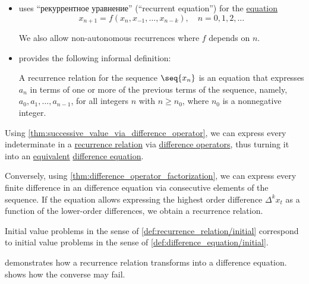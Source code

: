 \begin{remark}
\begin{itemize}
    We base our exposition of recurrences in finite fields in  on their book, but also consider more general recurrent sequences, and emphasize the difference between recurrence relations and sequences satisfying them.

    \item \Textcite[21]{Юмагулов2015ДинамическиеСистемы} uses \enquote{рекуррентное уравнение} (\enquote{recurrent equation}) for the \hyperref[def:equation]{equation}
    \begin{equation*}
      x_{n+1} = f(x_n, x_{-1}, \ldots, x_{n-k}), \quad n = 0, 1, 2, \ldots
    \end{equation*}

    We also allow non-autonomous recurrences where \( f \) depends on \( n \).

    \item \Textcite[def. 2.4.4]{Rosen2019DiscreteMathematics} provides the following informal definition:
    \begin{displayquote}
      A recurrence relation for the sequence \( \seq{ x_n } \) is an equation that expresses \( a_n \) in terms of one or more of the previous terms of the sequence, namely, \( a_0, a_1, \ldots, a_{n-1} \), for all integers \( n \) with \( n \geq n_0 \), where \( n_0 \) is a nonnegative integer.
    \end{displayquote}
  \end{itemize}
\end{remark}

\begin{proposition}\label{thm:recurrence_relations_and_difference_equations}
  Using \cref{thm:successive_value_via_difference_operator}, we can express every indeterminate in a \hyperref[def:recurrence_relation]{recurrence relation} via \hyperref[def:finite_difference_operator]{difference operators}, thus turning it into an \hyperref[con:equivalent_systems_of_equations]{equivalent} \hyperref[def:difference_equation]{difference equation}.

  Conversely, using \cref{thm:difference_operator_factorization}, we can express every finite difference in an difference equation via consecutive elements of the sequence. If the equation allows expressing the highest order difference \( \Delta^k x_t \) as a function of the lower-order differences, we obtain a recurrence relation.
\end{proposition}
\begin{comments}
  \item Initial value problems in the sense of \cref{def:recurrence_relation/initial} correspond to initial value problems in the sense of \cref{def:difference_equation/initial}.

  \item {} demonstrates how a recurrence relation transforms into a difference equation.  shows how the converse may fail.
\end{comments}


